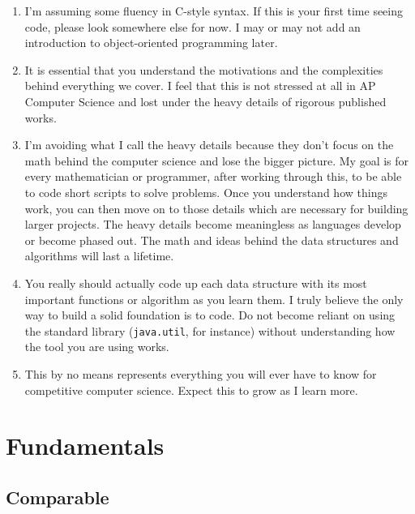 \documentclass[11pt]{book}
\begin{document}
\begin{enumerate}

\item

I'm assuming some fluency in C-style syntax. If this is your first time seeing code, please look somewhere else for now. I may or may not add an introduction to object-oriented programming later.

\item

It is essential that you understand the motivations and the complexities behind everything we cover. I feel that this is not stressed at all in AP Computer Science and lost under the heavy details of rigorous published works.

\item

I'm avoiding what I call the heavy details because they don't focus on the math behind the computer science and lose the bigger picture. My goal is for every mathematician or programmer, after working through this, to be able to code short scripts to solve problems. Once you understand how things work, you can then move on to those details which are necessary for building larger projects. The heavy details become meaningless as languages develop or become phased out. The math and ideas behind the data structures and algorithms will last a lifetime.

\item

You really should actually code up each data structure with its most important functions or algorithm as you learn them. I truly believe the only way to build a solid foundation is to code. Do not become reliant on using the standard library (\texttt{java.util}, for instance) without understanding how the tool you are using works.

\item

This by no means represents everything you will ever have to know for competitive computer science. Expect this to grow as I learn more.

\end{enumerate}

\chapter{Fundamentals}

\section{Comparable}
\end{document}
